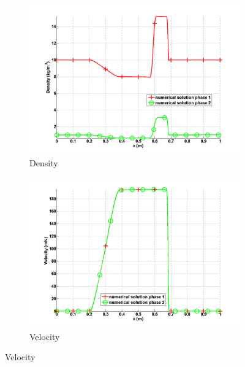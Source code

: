 \documentclass{anstrans}
\begin{document}
\begin{figure}[H]
        \begin{subfigure}[b]{0.5\textwidth}
                \centering
                \includegraphics[width=\textwidth]{plots/relaxation_two_phases_density.png}
                \caption{Density}
                \label{fig:density}
        \end{subfigure}%

        \begin{subfigure}[b]{0.495\textwidth}
                \centering
                \includegraphics[width=\textwidth]{plots/relaxation_two_phases_velocity.png}
                \caption{Velocity}
                \label{fig:velocity}
        \end{subfigure}


\end{figure}
\end{document}
